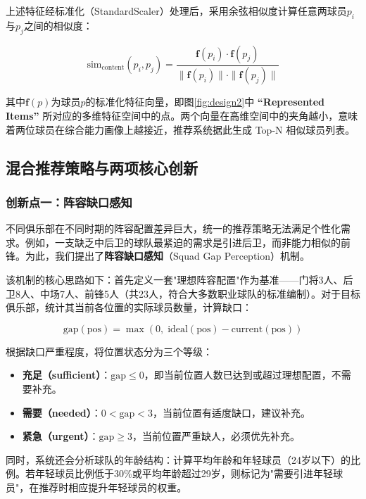 \documentclass[a4paper]{article}
\begin{document}
上述特征经标准化（StandardScaler）处理后，采用余弦相似度计算任意两球员\(p_i\)与\(p_j\)之间的相似度：

\begin{equation}
    \text{sim}_{\text{content}}(p_i, p_j) = \frac{\mathbf{f}(p_i) \cdot \mathbf{f}(p_j)}{\|\mathbf{f}(p_i)\| \cdot \|\mathbf{f}(p_j)\|}
\end{equation}

其中\(\mathbf{f}(p)\)为球员\(p\)的标准化特征向量，即图\ref{fig:design2}中 \textbf{``Represented Items''} 所对应的多维特征空间中的点。两个向量在高维空间中的夹角越小，意味着两位球员在综合能力画像上越接近，推荐系统据此生成 Top-N 相似球员列表。

\subsection{混合推荐策略与两项核心创新}
\label{sec:hybrid}

\subsubsection{创新点一：阵容缺口感知}

不同俱乐部在不同时期的阵容配置差异巨大，统一的推荐策略无法满足个性化需求。例如，一支缺乏中后卫的球队最紧迫的需求是引进后卫，而非能力相似的前锋。为此，我们提出了\textbf{阵容缺口感知}（Squad Gap Perception）机制。

该机制的核心思路如下：首先定义一套"理想阵容配置"作为基准——门将3人、后卫8人、中场7人、前锋5人（共23人，符合大多数职业球队的标准编制）。对于目标俱乐部，统计其当前各位置的实际球员数量，计算缺口：

\begin{equation}
    \text{gap}(\text{pos}) = \max(0,\; \text{ideal}(\text{pos}) - \text{current}(\text{pos}))
\end{equation}

根据缺口严重程度，将位置状态分为三个等级：
\begin{itemize}
    \item \textbf{充足（sufficient）}：\(\text{gap} \leq 0\)，即当前位置人数已达到或超过理想配置，不需要补充。
    \item \textbf{需要（needed）}：\(0 < \text{gap} < 3\)，当前位置有适度缺口，建议补充。
    \item \textbf{紧急（urgent）}：\(\text{gap} \geq 3\)，当前位置严重缺人，必须优先补充。
\end{itemize}

同时，系统还会分析球队的年龄结构：计算平均年龄和年轻球员（24岁以下）的比例。若年轻球员比例低于30\%或平均年龄超过29岁，则标记为"需要引进年轻球员"，在推荐时相应提升年轻球员的权重。
\end{document}
